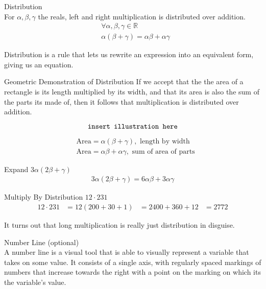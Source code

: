\documentclass{book}
\begin{document}
  {\axiom Distribution \\
    For $\alpha, \beta, \gamma$ the reals, left and right multiplication is distributed over addition.
    \begin{align*}
      & \forall \alpha, \beta, \gamma \in \mathbb{R}\\
      & \alpha (\beta + \gamma) = \alpha \beta + \alpha \gamma
    \end{align*}

    Distribution is a rule that lets us rewrite an expression into an equivalent form, giving us an equation.\\
  }

  {\remark Geometric Demonstration of Distribution 
    If we accept that the the area of a rectangle is its length multiplied by its width, and that its area is also the sum of the parts its made of, then it follows that multiplication is distributed over addition.

    $$\text{\texttt{insert illustration here}}$$

    \begin{align*}
      & \text{Area} = \alpha (\beta + \gamma), \text{ length by width}\\
      & \text{Area} = \alpha \beta + \alpha \gamma, \text{ sum of area of parts}
    \end{align*}
  }

  {\example Expand $3 \alpha(2 \beta + \gamma)$ 
    \begin{align*}
      3 \alpha (2 \beta + \gamma) = 6 \alpha \beta + 3 \alpha \gamma
    \end{align*}
  }

  {\example Multiply By Distribution $12 \cdot 231$
    \begin{align*}
      12 \cdot 231 & = 12 (200 + 30 + 1)
      & = 2400 + 360 + 12
      & = 2772
    \end{align*}

    It turns out that long multiplication is really just distribution in disguise.\\
  }

  {\remark Number Line (optional) \\
    A number line is a visual tool that is able to visually represent a variable that takes on some value. It consists of a single axis, with regularly spaced markings of numbers that increase towards the right with a point on the marking on which its the variable's value.\\
  }
\end{document}
